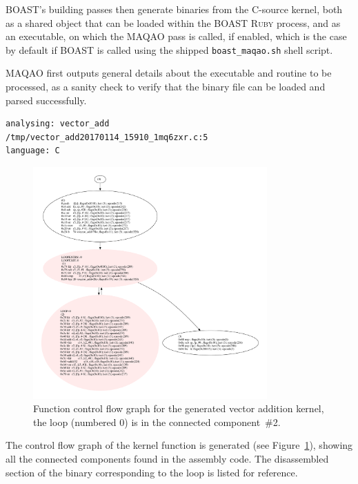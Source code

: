 \documentclass[11pt, a4paper, twoside]{montblanc2}
\def\ruby{\textsc{Ruby}\xspace}
\begin{document}
BOAST's building passes then generate binaries from the C-source kernel, both as 
a shared object that can be loaded within the BOAST \ruby process, and as an 
executable, on which the MAQAO pass is called, if enabled, which is the case by 
default if BOAST is called using the shipped \verb|boast_maqao.sh| shell script.

MAQAO first outputs general details about the executable and routine to be 
processed, as a sanity check to verify that the binary file can be loaded and 
parsed successfully.

\begin{verbatim}
analysing: vector_add
/tmp/vector_add20170114_15910_1mq6zxr.c:5
language: C
\end{verbatim}

\begin{figure}[h]
  \centering
\includegraphics[width=0.8\textwidth]{c_no_fpic}
\caption{Function control flow graph for the generated vector addition kernel, the loop (numbered 0) is in the connected component~\#2.}\label{fig:cfg_vec_add}
\end{figure}

The control flow graph of the kernel function is generated 
(see Figure~\ref{fig:cfg_vec_add}), showing all the connected components found in the 
assembly code. The disassembled section of the binary corresponding to the loop 
is listed for reference.
\end{document}

